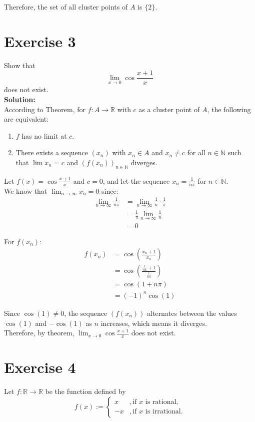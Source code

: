 \documentclass{article}
\begin{document}
Therefore, the set of all cluster points of $A$ is $\{2\}$.
\newpage

\section*{Exercise 3}
Show that 
$$\lim_{x \to 0} \cos \frac{x + 1}{x}$$
does not exist. \\

\textbf{Solution: } \\

According to Theorem, for $f: A \rightarrow \mathbb{R}$ with $c$ as a cluster point of $A$, the following are equivalent:
\begin{enumerate}[(1)]
    \item $f$ has no limit at $c$.
    \item There exists a sequence $(x_n)$ with $x_n \in A$ and $x_n \neq c$ for all $n \in \mathbb{N}$ such that
    $\lim x_n = c$ and $(f(x_n))_{n\in\mathbb{N}}$ diverges.
\end{enumerate}

Let $f(x) = \cos\frac{x+1}{x}$ and $c = 0$, and let the sequence $x_n = \frac{1}{n\pi}$ for $n \in \mathbb{N}$. \\

We know that $\lim_{n\to\infty} x_n = 0$ since:
\begin{align*}
\lim_{n\to\infty} \frac{1}{n\pi} &= \lim_{n\to\infty} \frac{1}{n} \cdot \frac{1}{\pi} \\
&= \frac{1}{\pi}\lim_{n\to\infty} \frac{1}{n} \\
&= 0
\end{align*}

For $f(x_n)$:
\begin{align*}
f(x_n) &= \cos\left(\frac{x_n+1}{x_n}\right)\\
&= \cos\left(\frac{\frac{1}{n\pi}+1}{\frac{1}{n\pi}}\right)\\
&= \cos(1 + n\pi) \\
&= (-1)^n\cos(1)
\end{align*}

Since $\cos(1) \neq 0$, the sequence $(f(x_n))$ alternates between the values $\cos(1)$ and $-\cos(1)$ as $n$ increases, which means it diverges. \\

Therefore, by theorem, $\lim_{x \to 0} \cos \frac{x + 1}{x}$ does not exist.

\newpage

\section*{Exercise 4}
Let $f : \mathbb{R} \to \mathbb{R}$ be the function defined by
$$f(x) := \begin{cases}
x & , \text{if } x \text{ is rational}, \\
-x & , \text{if } x \text{ is irrational}.
\end{cases}$$
\end{document}
